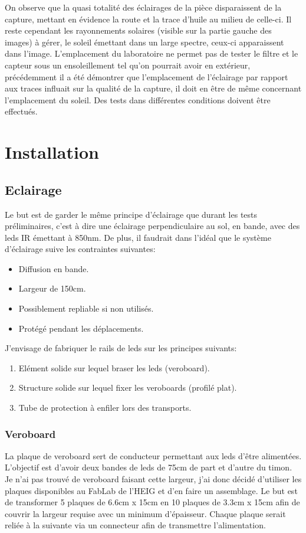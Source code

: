 On observe que la quasi totalité des éclairages de la pièce disparaissent de la capture,
mettant en évidence la route et la trace d'huile au milieu de celle-ci. Il reste cependant les rayonnements solaires (visible sur la partie gauche des images)
à gérer, le soleil émettant dans un large spectre, ceux-ci apparaissent dans l'image. L'emplacement du laboratoire ne permet pas de
tester le filtre et le capteur sous un ensoleillement tel qu'on pourrait avoir en extérieur, précédemment il a été démontrer que l'emplacement
de l'éclairage par rapport aux traces influait sur la qualité de la capture, il doit en être de même concernant l'emplacement du soleil. Des tests dans
différentes conditions doivent être effectués.

\section{Installation}
\subsection{Eclairage}
Le but est de garder le même principe d'éclairage que durant les tests préliminaires, c'est à dire une éclairage perpendiculaire au sol,
en bande, avec des leds IR émettant à 850nm. De plus, il faudrait dans l'idéal que le système d'éclairage suive les contraintes suivantes:
\begin{itemize}
    \item Diffusion en bande.
    \item Largeur de 150cm.
    \item Possiblement repliable si non utilisés.
    \item Protégé pendant les déplacements.
\end{itemize}
J'envisage de fabriquer le rails de leds sur les principes suivants:
\begin{enumerate}
    \item Elément solide sur lequel braser les leds (veroboard).
    \item Structure solide sur lequel fixer les veroboards (profilé plat).
    \item Tube de protection à enfiler lors des transports.
\end{enumerate}
\subsubsection{Veroboard}
La plaque de veroboard sert de conducteur permettant aux leds d'être alimentées. L'objectif est d'avoir deux bandes de leds de 75cm de part et d'autre
du timon. Je n'ai pas trouvé de veroboard faisant cette largeur, j'ai donc décidé d'utiliser les plaques disponibles au FabLab de l'HEIG et d'en faire un assemblage.
Le but est de transformer 5 plaques de 6.6cm x 15cm en 10 plaques de 3.3cm x 15cm afin de couvrir la largeur requise avec un minimum d'épaisseur.
Chaque plaque serait reliée à la suivante via un connecteur afin de transmettre l'alimentation.

